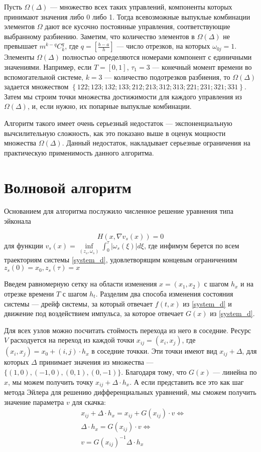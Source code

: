 Пусть $\Omega(\Delta)$ --- множество всех таких управлений, компоненты
которых принимают значения либо 0 либо 1. Тогда всевозможные выпуклые
комбинации элементов $\Omega$ дают все кусочно постоянные управления,
соответствующие выбранному разбиению.  Заметим, что количество
элементов в $\Omega(\Delta)$ не превышает $m^{k-q} C_k^q$, где
$q=\left[\frac{b-a}{h}\right]$ --- число отрезков, на которых
$\omega_{0j}=1$.  Элементы $\Omega(\Delta)$ полностью определяются
номерами компонент с единичными значениями. Например, если $T=[0,1]$,
$\tau_1=3$ --- конечный момент времени во вспомогательной системе,
$k=3$ --- количество подотрезков разбиения, то $\Omega(\Delta)$
задается множеством
$\left\{122; 123 ; 132 ; 133 ;212 ; 213; 312 ; 313 ; 221; 231 ; 321 ;
  331 \right\}$.
Затем мы строим точки множества достижимости для каждого управления из
$\Omega(\Delta)$, и, если нужно, их попарные выпуклые комбинации.

Алгоритм такого имеет очень серьезный недостаток --- экспоненциальную
вычсилительную сложность, как это показано выше в оценук мощности
множества $\Omega(\Delta)$. Данный недостаток, накладывает серьезные
ограничения на практическую применимость данного алгоритма.

\section{Волновой алгоритм}
\label{sec:wave_alg}

Основанием для алгоритма послужило численное решение уравнения типа
эйконала \cite{S1999} 

\begin{equation*}
  H(x,\nabla v_s(x)) = 0
\end{equation*}
для функции $v_s(x) = \inf \limits_{(z_s,\omega_s)} \int_0^\tau
| \omega_s(\xi) | d\xi$, где инфимум берется по всем траекториям
системы \eqref{system_d}, удовлетворящим концевым ограничениям $z_s(0)
= x_0, z_s(\tau) = x$

Введем равномерную сетку на области изменения $x=(x_1,x_2)$ с шагом
$h_x$ и на отрезке времени $T$ с шагом $h_t$.
Разделим два способа изменения состояния системы — дрейф системы, за
который отвечает $f(t,x)$ из \eqref{system_d} и
движение под воздействием импульса, за которое отвечает $G(x)$ из
\eqref{system_d}.

Для всех узлов можно посчитать стоймость перехода из него в соседние.
Ресурс $V$ расходуется на переход из каждой точки
$x_{ij} = (x_i,x_j)$, где $(x_i,x_j) = x_0 + (i,j)\cdot h_x$ в
соседние точкки. Эти точки имеют вид $x_{ij} +\Delta$, для которых
$\Delta$ принимает значения из множества --- $
\{(1,0),(-1,0),(0,1),(0,-1)\}$.
Благодаря тому, что $G(x)$ --- линейна по $x$, мы можем получить точку
$x_{ij} +\Delta \cdot h_x$. А если представить все это как шаг метода
Эйлера для решению дифференциальных уравнений, мы сможем получить
значение параметра $v$ для скачка:
\begin{eqnarray*}
  &x_{ij} +\Delta \cdot h_x = x_{ij} + G(x_{ij})\cdot v \Leftrightarrow\\
  &\Delta \cdot h_x = G(x_{ij})\cdot v \Leftrightarrow\\
  &v = G(x_{ij})^{-1} \Delta \cdot h_x
\end{eqnarray*}

